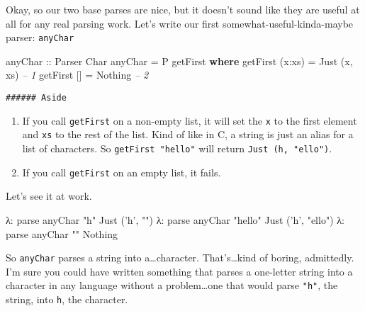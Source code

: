 \documentclass[]{article}
\newenvironment{Shaded}{}{}
\newcommand{\KeywordTok}[1]{\textcolor[rgb]{0.00,0.44,0.13}{\textbf{{#1}}}}
\newcommand{\DataTypeTok}[1]{\textcolor[rgb]{0.56,0.13,0.00}{{#1}}}
\newcommand{\CharTok}[1]{\textcolor[rgb]{0.25,0.44,0.63}{{#1}}}
\newcommand{\StringTok}[1]{\textcolor[rgb]{0.25,0.44,0.63}{{#1}}}
\newcommand{\CommentTok}[1]{\textcolor[rgb]{0.38,0.63,0.69}{\textit{{#1}}}}
\newcommand{\OtherTok}[1]{\textcolor[rgb]{0.00,0.44,0.13}{{#1}}}
\newcommand{\FunctionTok}[1]{\textcolor[rgb]{0.02,0.16,0.49}{{#1}}}
\newcommand{\NormalTok}[1]{{#1}}
\begin{document}
Okay, so our two base parses are nice, but it doesn't sound like they are useful at all for any real
parsing work. Let's write our first somewhat-useful-kinda-maybe parser: \texttt{anyChar}

\begin{Shaded}
\begin{Highlighting}[]
\OtherTok{anyChar ::} \DataTypeTok{Parser} \DataTypeTok{Char}
\NormalTok{anyChar }\FunctionTok{=} \DataTypeTok{P} \NormalTok{getFirst}
    \KeywordTok{where}
        \NormalTok{getFirst (x}\FunctionTok{:}\NormalTok{xs) }\FunctionTok{=} \DataTypeTok{Just} \NormalTok{(x, xs)          }\CommentTok{-- 1}
        \NormalTok{getFirst []     }\FunctionTok{=} \DataTypeTok{Nothing}               \CommentTok{-- 2}
\end{Highlighting}
\end{Shaded}

\begin{verbatim}
###### Aside
\end{verbatim}

\begin{enumerate}
\def\labelenumi{\arabic{enumi}.}
\tightlist
\item
  If you call \texttt{getFirst} on a non-empty list, it will set the \texttt{x} to the first element
  and \texttt{xs} to the rest of the list. Kind of like in C, a string is just an alias for a list
  of characters. So \texttt{getFirst\ "hello"} will return
  \texttt{Just\ (\textquotesingle{}h\textquotesingle{},\ "ello")}.
\item
  If you call \texttt{getFirst} on an empty list, it fails.
\end{enumerate}

Let's see it at work.

\begin{Shaded}
\begin{Highlighting}[]
\NormalTok{λ}\FunctionTok{:} \NormalTok{parse anyChar }\StringTok{"h"}
\DataTypeTok{Just} \NormalTok{(}\CharTok{'h'}\NormalTok{, }\StringTok{""}\NormalTok{)}
\NormalTok{λ}\FunctionTok{:} \NormalTok{parse anyChar }\StringTok{"hello"}
\DataTypeTok{Just} \NormalTok{(}\CharTok{'h'}\NormalTok{, }\StringTok{"ello"}\NormalTok{)}
\NormalTok{λ}\FunctionTok{:} \NormalTok{parse anyChar }\StringTok{""}
\DataTypeTok{Nothing}
\end{Highlighting}
\end{Shaded}

So \texttt{anyChar} parses a string into a\ldots{}character. That's\ldots{}kind of boring,
admittedly. I'm sure you could have written something that parses a one-letter string into a
character in any language without a problem\ldots{}one that would parse \texttt{"h"}, the string,
into \texttt{\textquotesingle{}h\textquotesingle{}}, the character.
\end{document}
